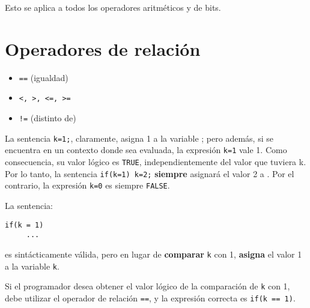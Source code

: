 Esto se aplica a todos los operadores aritméticos y de bits.

\section{Operadores de relación}

\begin{itemize}
\item \lstinline{==} (igualdad)
\item \lstinline{<, >, <=, >=}
\item \lstinline{!=} (distinto de)
\end{itemize}


La sentencia \lstinline{k=1;}, claramente, asigna 1 a la variable ; pero además, si se encuentra en un contexto donde sea evaluada, la expresión \lstinline{k=1} vale 1. Como consecuencia, su valor lógico es \lstinline{TRUE}, independientemente del valor que tuviera k. Por lo tanto, la sentencia \lstinline{if(k=1) k=2;} \textbf{siempre} asignará el valor 2 a .
Por el contrario, la expresión \lstinline{k=0} es siempre \lstinline{FALSE}.

La sentencia:
\begin{lstlisting}
if(k = 1)
     ...
\end{lstlisting}     
es sintácticamente válida, pero en lugar de \textbf{comparar} \lstinline{k} con 1, \textbf{asigna} el valor 1 a la variable \lstinline{k}. 

Si el programador desea obtener el valor lógico de la comparación de \lstinline{k} con 1, debe utilizar el operador de relación \lstinline{==}, y la expresión correcta es \lstinline{if(k == 1)}. 



